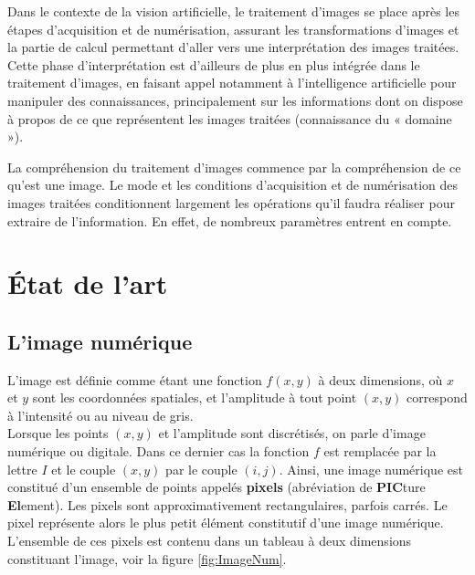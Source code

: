 \documentclass[a4paper,12pt]{report}
\begin{document}
Dans le contexte de la vision artificielle, le traitement d'images se place après les étapes d'acquisition et de numérisation, assurant les transformations d'images et la partie de calcul permettant d'aller vers une interprétation des images traitées. Cette phase d'interprétation est d'ailleurs de plus en plus intégrée dans le traitement d'images, en faisant appel notamment à l'intelligence artificielle pour manipuler des connaissances, principalement sur les informations dont on dispose à propos de ce que représentent les images traitées (connaissance du « domaine »).

La compréhension du traitement d'images commence par la compréhension de ce qu'est une image. Le mode et les conditions d'acquisition et de numérisation des images traitées conditionnent largement les opérations qu'il faudra réaliser pour extraire de l'information. En effet, de nombreux paramètres entrent en compte.

\chapter{\'Etat de l'art} 

\section{L'image numérique}
L'image est définie comme étant une fonction $f(x,y)$ à deux dimensions, où $x$ et $y$ sont les coordonnées spatiales, et l'amplitude à tout point $(x,y)$ correspond à l'intensité ou au niveau de gris. \\
Lorsque les points $(x,y)$ et l'amplitude sont discrétisés, on parle d'image numérique ou digitale. Dans ce dernier cas la fonction $f$ est remplacée par la lettre $I$ et le couple $(x,y)$ par le couple $(i,j)$. Ainsi, une image numérique est constitué d'un ensemble de points appelés \textbf{pixels } (abréviation de \textbf{PIC}ture \textbf{El}ement). Les pixels sont approximativement rectangulaires, parfois carrés. Le pixel représente alors le plus petit élément constitutif d'une image numérique. L'ensemble de ces pixels est contenu dans un tableau à deux dimensions constituant l'image, voir la figure \ref{fig:ImageNum}.
\end{document}
